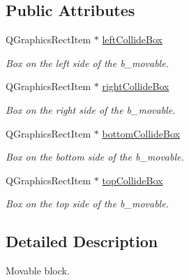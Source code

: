 \subsection*{Public Attributes}
\begin{DoxyCompactItemize}
\item 
\hypertarget{class_b___movable_ab838f983e5e7b13148fc7f4873f2c347}{}Q\+Graphics\+Rect\+Item $\ast$ \hyperlink{class_b___movable_ab838f983e5e7b13148fc7f4873f2c347}{left\+Collide\+Box}\label{class_b___movable_ab838f983e5e7b13148fc7f4873f2c347}

\begin{DoxyCompactList}\small\item\em Box on the left side of the b\+\_\+movable. \end{DoxyCompactList}\item 
\hypertarget{class_b___movable_a5da8e8b462e4504f219857a3e007ad97}{}Q\+Graphics\+Rect\+Item $\ast$ \hyperlink{class_b___movable_a5da8e8b462e4504f219857a3e007ad97}{right\+Collide\+Box}\label{class_b___movable_a5da8e8b462e4504f219857a3e007ad97}

\begin{DoxyCompactList}\small\item\em Box on the right side of the b\+\_\+movable. \end{DoxyCompactList}\item 
\hypertarget{class_b___movable_a6ad546481827dc987708ad36023ba21b}{}Q\+Graphics\+Rect\+Item $\ast$ \hyperlink{class_b___movable_a6ad546481827dc987708ad36023ba21b}{bottom\+Collide\+Box}\label{class_b___movable_a6ad546481827dc987708ad36023ba21b}

\begin{DoxyCompactList}\small\item\em Box on the bottom side of the b\+\_\+movable. \end{DoxyCompactList}\item 
\hypertarget{class_b___movable_a0609a13a4c686a8c7a4a0edb5e87efbf}{}Q\+Graphics\+Rect\+Item $\ast$ \hyperlink{class_b___movable_a0609a13a4c686a8c7a4a0edb5e87efbf}{top\+Collide\+Box}\label{class_b___movable_a0609a13a4c686a8c7a4a0edb5e87efbf}

\begin{DoxyCompactList}\small\item\em Box on the top side of the b\+\_\+movable. \end{DoxyCompactList}\end{DoxyCompactItemize}


\subsection{Detailed Description}
Movable block. 

